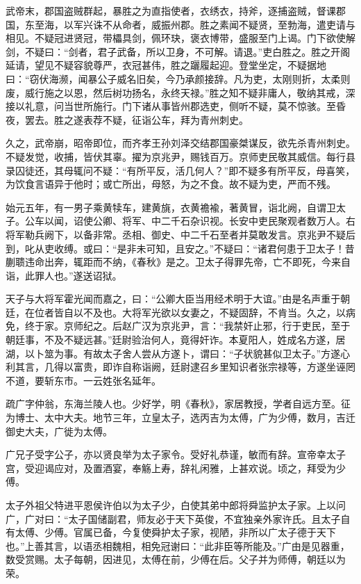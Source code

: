 \documentclass[12pt,UTF8]{ctexbook}
\begin{document}
武帝末，郡国盗贼群起，暴胜之为直指使者，衣绣衣，持斧，逐捕盗贼，督课郡国，东至海，以军兴诛不从命者，威振州郡。胜之素闻不疑贤，至勃海，遣吏请与相见。不疑冠进贤冠，带櫑具剑，佩环玦，褒衣博带，盛服至门上谒。门下欲使解剑，不疑曰：“剑者，君子武备，所以卫身，不可解。请退。”吏白胜之。胜之开阁延请，望见不疑容貌尊严，衣冠甚伟，胜之躧履起迎。登堂坐定，不疑据地曰：“窃伏海濒，闻暴公子威名旧矣，今乃承颜接辞。凡为吏，太刚则折，太柔则废，威行施之以恩，然后树功扬名，永终天禄。”胜之知不疑非庸人，敬纳其戒，深接以礼意，问当世所施行。门下诸从事皆州郡选吏，侧听不疑，莫不惊骇。至昏夜，罢去。胜之遂表荐不疑，征诣公车，拜为青州刺史。



久之，武帝崩，昭帝即位，而齐孝王孙刘泽交结郡国豪桀谋反，欲先杀青州刺史。不疑发觉，收捕，皆伏其辜。擢为京兆尹，赐钱百万。京师吏民敬其威信。每行县录囚徒还，其母辄问不疑：“有所平反，活几何人？”即不疑多有所平反，母喜笑，为饮食言语异于他时；或亡所出，母怒，为之不食。故不疑为吏，严而不残。



始元五年，有一男子乘黄犊车，建黄旐，衣黄襜褕，著黄冒，诣北阙，自谓卫太子。公车以闻，诏使公卿、将军、中二千石杂识视。长安中吏民聚观者数万人。右将军勒兵阙下，以备非常。丞相、御史、中二千石至者并莫敢发言。京兆尹不疑后到，叱从吏收缚。或曰：“是非未可知，且安之。”不疑曰：“诸君何患于卫太子！昔蒯聩违命出奔，辄距而不纳，《春秋》是之。卫太子得罪先帝，亡不即死，今来自诣，此罪人也。”遂送诏狱。



天子与大将军霍光闻而嘉之，曰：“公卿大臣当用经术明于大谊。”由是名声重于朝廷，在位者皆自以不及也。大将军光欲以女妻之，不疑固辞，不肯当。久之，以病免，终于家。京师纪之。后赵广汉为京兆尹，言：“我禁奸止邪，行于吏民，至于朝廷事，不及不疑远甚。”廷尉验治何人，竟得奸诈。本夏阳人，姓成名方遂，居湖，以卜筮为事。有故太子舍人尝从方遂卜，谓曰：“子状貌甚似卫太子。”方遂心利其言，几得以富贵，即诈自称诣阙，廷尉逮召乡里知识者张宗禄等，方遂坐诬罔不道，要斩东市。一云姓张名延年。



疏广字仲翁，东海兰陵人也。少好学，明《春秋》，家居教授，学者自远方至。征为博士、太中大夫。地节三年，立皇太子，选丙吉为太傅，广为少傅，数月，吉迁御史大夫，广徙为太傅。



广兄子受字公子，亦以贤良举为太子家令。受好礼恭谨，敏而有辞。宣帝幸太子宫，受迎谒应对，及置酒宴，奉觞上寿，辞礼闲雅，上甚欢说。顷之，拜受为少傅。



太子外祖父特进平恩侯许伯以为太子少，白使其弟中郎将舜监护太子家。上以问广，广对曰：“太子国储副君，师友必于天下英俊，不宜独亲外家许氏。且太子自有太傅、少傅。官属已备，今复使舜护太子家，视陋，非所以广太子德于天下也。”上善其言，以语丞相魏相，相免冠谢曰：“此非臣等所能及。”广由是见器重，数受赏赐。太子每朝，因进见，太傅在前，少傅在后。父子并为师傅，朝廷以为荣。
\end{document}
